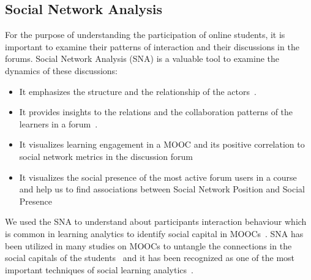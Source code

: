 \documentclass[manuscript,screen,review]{acmart}
\begin{document}
\subsection{Social Network Analysis}
For the purpose of understanding  the participation of online students, it is important to examine their patterns of interaction and their discussions in the forums. Social Network Analysis (SNA) is a valuable tool to examine the dynamics of these discussions: 
\begin{itemize}
    \item It emphasizes the structure and the relationship of the 
actors~\cite{butts2008social}.
    \item It provides insights to the relations and the collaboration patterns of the learners in a forum~\cite{rabbany2014collaborative}.
    \item It visualizes learning engagement in a MOOC and its positive correlation to social network metrics in the discussion forum~\cite{yang2013turn}
    \item It visualizes the social presence of the most active forum users in a course~\cite{oleksandra2016untangling} and help us to find associations between Social Network Position and Social Presence~\cite{joksimovic2015you,kovanovic2014source}
    \end{itemize}
We used the SNA to understand about participants interaction behaviour which is common in learning analytics to identify social capital in MOOCs~\cite{joksimovic2015you}. SNA has been utilized in many studies on MOOCs to untangle the connections in the social capitals of the students~\cite{oleksandra2016untangling,kovanovic2014source} and it has been recognized as one of the most important techniques of social learning analytics~\cite{shum2012social,ferguson2012social}.
\end{document}
